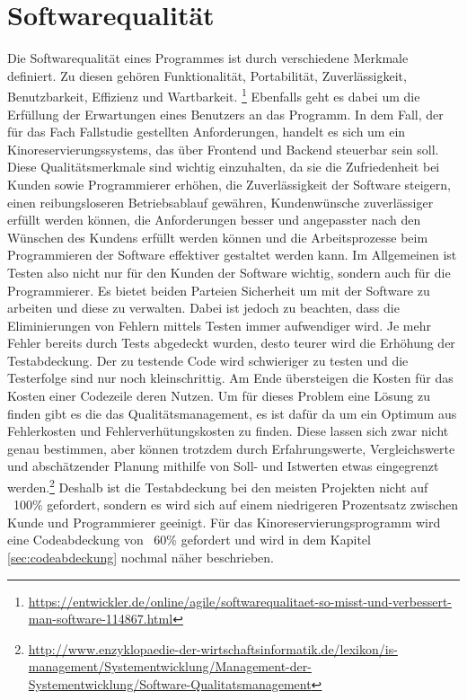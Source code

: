 \section{Softwarequalität}

Die Softwarequalität eines Programmes ist durch verschiedene Merkmale definiert. Zu diesen gehören Funktionalität, Portabilität, Zuverlässigkeit, Benutzbarkeit, Effizienz und Wartbarkeit. \footnote{\url{https://entwickler.de/online/agile/softwarequalitaet-so-misst-und-verbessert-man-software-114867.html}}
Ebenfalls geht es dabei um die Erfüllung der Erwartungen eines Benutzers an das Programm. In dem Fall, der für das Fach Fallstudie gestellten Anforderungen, handelt es sich um ein Kinoreservierungssystems, das über Frontend und Backend steuerbar sein soll.
Diese Qualitätsmerkmale sind wichtig einzuhalten, da sie die Zufriedenheit bei Kunden sowie Programmierer erhöhen, die Zuverlässigkeit  der Software steigern, einen reibungsloseren Betriebsablauf gewähren,  Kundenwünsche zuverlässiger erfüllt werden können, die Anforderungen besser und angepasster nach den Wünschen des Kundens erfüllt werden können und die Arbeitsprozesse beim Programmieren der Software effektiver gestaltet werden kann.
Im Allgemeinen ist Testen also nicht nur für den Kunden der Software wichtig, sondern auch für die Programmierer. 
Es bietet beiden Parteien Sicherheit um mit der Software zu arbeiten und diese zu verwalten. 
Dabei ist jedoch zu beachten, dass die Eliminierungen von Fehlern mittels Testen immer aufwendiger wird.
Je mehr Fehler bereits durch Tests abgedeckt wurden, desto teurer wird die Erhöhung der Testabdeckung. Der zu testende Code wird schwieriger zu testen und die Testerfolge sind nur noch kleinschrittig. Am Ende übersteigen die Kosten für das Kosten einer Codezeile deren Nutzen. Um für dieses Problem eine Lösung zu finden gibt es die das Qualitätsmanagement, es ist dafür da um ein Optimum aus Fehlerkosten und Fehlerverhütungskosten zu finden. Diese lassen sich zwar nicht genau bestimmen, aber können trotzdem durch Erfahrungswerte, Vergleichswerte und abschätzender Planung mithilfe von Soll- und Istwerten etwas eingegrenzt werden.\footnote{\url{http://www.enzyklopaedie-der-wirtschaftsinformatik.de/lexikon/is-management/Systementwicklung/Management-der-Systementwicklung/Software-Qualitatsmanagement}} Deshalb ist die Testabdeckung bei den meisten Projekten nicht auf ~100\% gefordert, sondern es wird sich auf einem niedrigeren Prozentsatz zwischen Kunde und Programmierer geeinigt. Für das Kinoreservierungsprogramm wird eine Codeabdeckung von ~60\% gefordert und wird in dem Kapitel \vref{sec:codeabdeckung} nochmal näher beschrieben.
